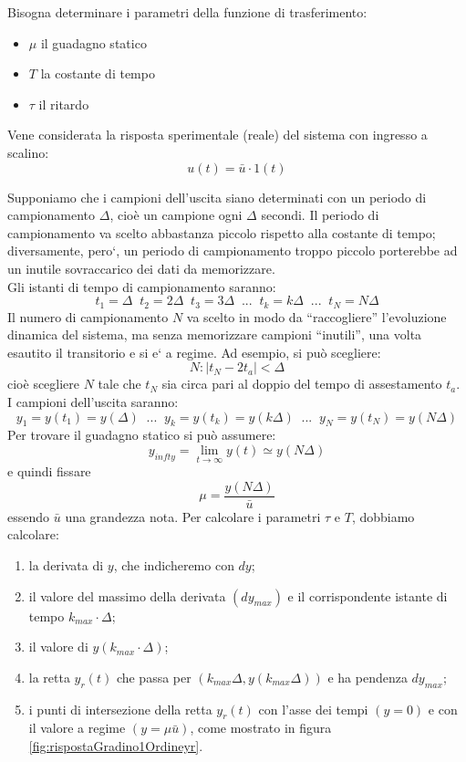 \documentclass[a4paper]{report}
\begin{document}
Bisogna determinare i parametri della funzione di trasferimento:
\begin{itemize}
\item $\mu$ il guadagno statico
\item $T$ la costante di tempo
\item $\tau$ il ritardo
\end{itemize}
Vene considerata la risposta sperimentale (reale) del sistema con
ingresso a scalino:
\[
u(t) = \bar{u} \cdot 1(t)
\]

Supponiamo che i campioni dell'uscita siano determinati con un periodo
di campionamento $\Delta$, cio\`e un campione ogni $\Delta$
secondi. Il periodo di campionamento va scelto abbastanza piccolo
rispetto alla costante di tempo; diversamente, pero`, un periodo di
campionamento troppo piccolo porterebbe ad un inutile sovraccarico dei
dati da memorizzare.\\
Gli istanti di tempo di campionamento saranno:
\[
t_1 = \Delta \;\; t_2 = 2\Delta \;\; t_3 = 3\Delta \;\; ... \;\; t_k =
k\Delta \;\; ... \;\; t_N = N\Delta
\]
Il numero di campionamento $N$ va scelto in modo da ``raccogliere''
l'evoluzione dinamica del sistema, ma senza memorizzare campioni
``inutili'', una volta esautito il transitorio e si e` a regime. Ad
esempio, si pu\`o scegliere:
\[
N : |t_N - 2 t_a| < \Delta
\]
cio\`e scegliere $N$ tale che $t_N$ sia circa pari al doppio del tempo
di assestamento $t_a$.\\
I campioni dell'uscita saranno:
\[
y_1 = y(t_1) = y (\Delta) \;\; ... \;\; y_k = y(t_k) = y(k\Delta) \;\;
... \;\; y_N = y(t_N) = y(N\Delta)
\]
Per trovare il guadagno statico si pu\`o assumere:
\[
y_{infty} = \lim_{t \to \infty} y(t) \simeq y(N\Delta)
\]
e quindi fissare
\[
\mu = \dfrac{y(N\Delta)}{\bar{u}}
\]
essendo $\bar{u}$ una grandezza nota. Per calcolare i parametri $\tau$
e $T$, dobbiamo calcolare:
\begin{enumerate}[label=\emph{\alph*})]
\item la derivata di $y$, che indicheremo con $dy$;
\item il valore del massimo della derivata $(dy_{max})$ e il
  corrispondente istante di tempo $k_{max} \cdot \Delta$;
\item il valore di $y(k_{max} \cdot \Delta)$;
\item la retta $y_r(t)$ che passa per $(k_{max}\Delta,
  y(k_{max}\Delta))$ e ha pendenza $dy_{max}$;
\item i punti di intersezione della retta $y_r(t)$ con l'asse dei
  tempi $(y = 0)$ e con il valore a regime $(y = \mu \bar{u})$, come
  mostrato in figura \ref{fig:rispostaGradino1Ordineyr}.
\end{enumerate}
\end{document}

